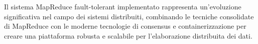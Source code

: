 \documentclass[12pt,a4paper]{article}
\begin{document}
Il sistema MapReduce fault-tolerant implementato rappresenta un'evoluzione significativa nel campo dei sistemi distribuiti, combinando le tecniche consolidate di MapReduce con le moderne tecnologie di consensus e containerizzazione per creare una piattaforma robusta e scalabile per l'elaborazione distribuita dei dati.
\end{document}
